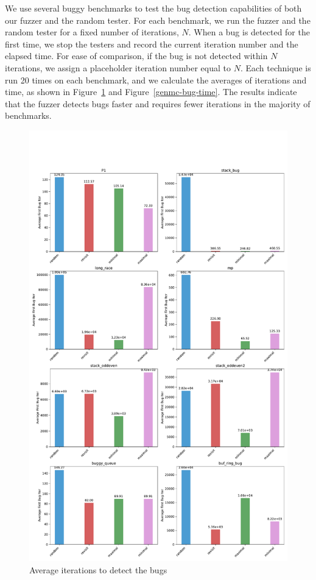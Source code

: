 We use several buggy benchmarks to test the bug detection capabilities of both our fuzzer and the random tester. For each benchmark, we run the fuzzer and the random tester for a fixed number of iterations, $N$. When a bug is detected for the first time, we stop the testers and record the current iteration number and the elapsed time. For ease of comparison, if the bug is not detected within $N$ iterations, we assign a placeholder iteration number equal to $N$. Each technique is run 20 times on each benchmark, and we calculate the averages of iterations and time, as shown in Figure~\ref{genmc-bug-iter} and Figure~\ref{genmc-bug-time}. The results indicate that the fuzzer detects bugs faster and requires fewer iterations in the majority of benchmarks.

\begin{figure}[h!tbp]
	\centering
	\includegraphics[scale=0.3]{figure/genmc-bug/first_bug_iter.pdf}
	\caption{Average iterations to detect the bugs}
	\label{genmc-bug-iter}
\end{figure}

